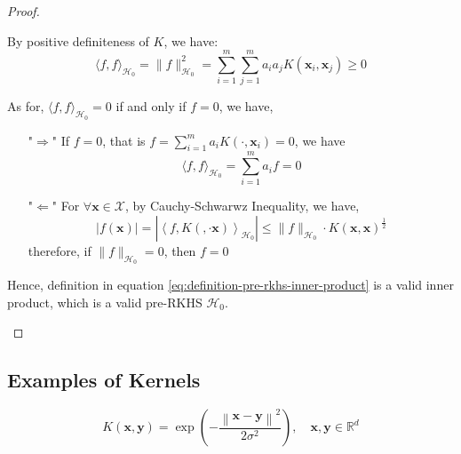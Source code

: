 \begin{proof}
\begin{enumerate}
\begin{enumerate}
                        By positive definiteness of $K$, we have:
                        \begin{equation*}
                            \langle f,f\rangle_{\mathcal{H}_{0}}=\|f\|_{\mathcal{H}_{0}}^{2}=\sum_{i=1}^{m}\sum_{j=1}^{m}a_{i}a_{j}K\left(\mathbf{x}_{i},\mathbf{x}_{j}\right)\geq 0
                        \end{equation*}

                        As for, $\langle f,f\rangle_{\mathcal{H}_{0}}=0$ if and only if $f=0$, we have,
                        \begin{itemize}
                            \item["$\Rightarrow$"] If $f=0$, that is $f=\sum_{i=1}^{m}a_{i}K\left(\cdot,\mathbf{x}_{i}\right)=0$, we have
                                \begin{equation*}
                                    \langle f,f\rangle_{\mathcal{H}_{0}}=\sum_{i=1}^{m}a_{i}f=0
                                \end{equation*}
                            \item["$\Leftarrow$"] For $\forall\mathbf{x}\in\mathcal{X}$, by Cauchy-Schwarwz Inequality, we have,
                                \begin{equation*}
                                    |f(\mathbf{x})|=\left|\left\langle f,K\left(,\cdot{\mathbf{x}}\right)\right\rangle_{\mathcal{H}_{0}}\right|\leq\|f\|_{\mathcal{H}_{0}}\cdot K\left(\mathbf{x},\mathbf{x}\right)^{\frac{1}{2}}
                                \end{equation*}
                                therefore, if $\|f\|_{\mathcal{H}_{0}}=0$, then $f=0$
                        \end{itemize}
              \end{enumerate}
              Hence, definition in equation \ref{eq:definition-pre-rkhs-inner-product} is a valid inner product, which is a valid pre-RKHS $\mathcal{H}_{0}$.
    \end{enumerate}
\end{proof}

\subsection{Examples of Kernels}

\begin{example}
    \begin{equation}
        K(\mathbf{x},\mathbf{y})=\exp\left(-\frac{\left\|\mathbf{x}-\mathbf{y}\right\|^{2}}{2\sigma^{2}}\right),\quad\mathbf{x},\mathbf{y}\in\mathbb{R}^{d}
    \end{equation}
\end{example}

